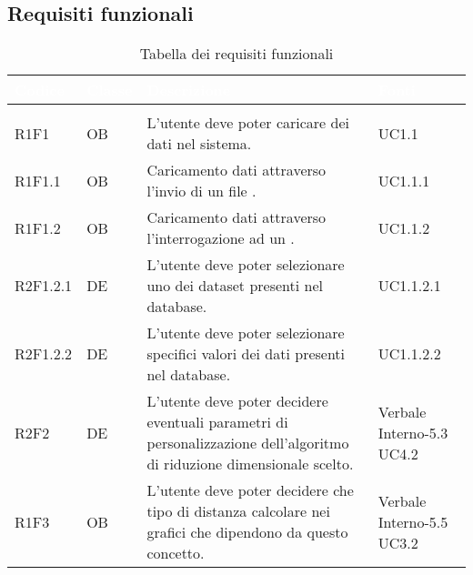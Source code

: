 \subsection{Requisiti funzionali}
\renewcommand{\arraystretch}{1.5}
{
\setlength\arrayrulewidth{1pt}
\begin{longtable}{C{2cm} | C{1.5cm} | C{9cm} | C{3.3cm}}
		\textcolor{white}{\textbf{Codice}} & 
		\textcolor{white}{\textbf{Classe}} & 
		\textcolor{white}{\textbf{Descrizione}} & 
		\textcolor{white}{\textbf{Fonti}} \\
		\endfirsthead
	    \\
	    \endfoot
	    \caption{Tabella dei requisiti funzionali}
	    \endlastfoot

R1F1 & OB & L'utente deve poter caricare dei dati nel sistema. & UC1.1\\
R1F1.1 & OB & Caricamento dati attraverso l'invio di un file . & UC1.1.1\\
R1F1.2 & OB & Caricamento dati attraverso l'interrogazione ad un . & UC1.1.2\\

R2F1.2.1 & DE & L'utente deve poter selezionare uno dei dataset presenti nel database. & UC1.1.2.1\\
R2F1.2.2 & DE & L'utente deve poter selezionare specifici valori dei dati presenti nel database. & UC1.1.2.2\\

R2F2 & DE & L'utente deve poter decidere eventuali parametri di personalizzazione dell'algoritmo di riduzione dimensionale scelto. & Verbale Interno-5.3 \newline UC4.2\\

R1F3 & OB & L'utente deve poter decidere che tipo di distanza calcolare nei grafici che dipendono da questo concetto. & Verbale Interno-5.5 \newline UC3.2\\


\end{longtable}}
